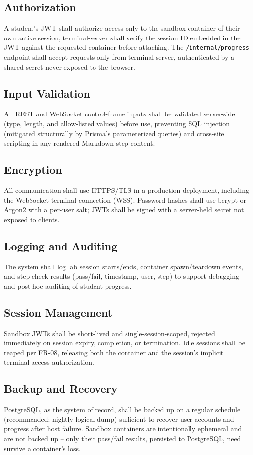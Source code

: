 \documentclass[11pt]{article}
\begin{document}
\subsection{Authorization}
A student's JWT shall authorize access only to the sandbox container
of their own active session; terminal-server shall verify the session
ID embedded in the JWT against the requested container before
attaching. The \texttt{/internal/progress} endpoint shall accept
requests only from terminal-server, authenticated by a shared secret
never exposed to the browser.

\subsection{Input Validation}
All REST and WebSocket control-frame inputs shall be validated
server-side (type, length, and allow-listed values) before use,
preventing SQL injection (mitigated structurally by Prisma's
parameterized queries) and cross-site scripting in any rendered
Markdown step content.

\subsection{Encryption}
All communication shall use HTTPS/TLS in a production deployment,
including the WebSocket terminal connection (WSS). Password hashes
shall use bcrypt or Argon2 with a per-user salt; JWTs shall be signed
with a server-held secret not exposed to clients.

\subsection{Logging and Auditing}
The system shall log lab session starts/ends, container spawn/teardown
events, and step check results (pass/fail, timestamp, user, step) to
support debugging and post-hoc auditing of student progress.

\subsection{Session Management}
Sandbox JWTs shall be short-lived and single-session-scoped, rejected
immediately on session expiry, completion, or termination. Idle
sessions shall be reaped per FR-08, releasing both the container and
the session's implicit terminal-access authorization.

\subsection{Backup and Recovery}
PostgreSQL, as the system of record, shall be backed up on a regular
schedule (recommended: nightly logical dump) sufficient to recover
user accounts and progress after host failure. Sandbox containers are
intentionally ephemeral and are not backed up -- only their pass/fail
results, persisted to PostgreSQL, need survive a container's loss.
\end{document}
